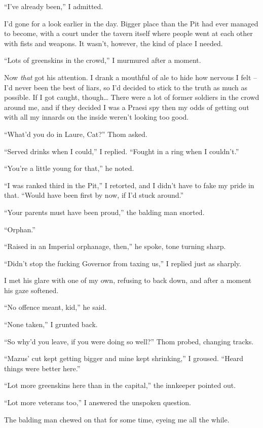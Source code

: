 \documentclass[12pt, openany]{book}
\begin{document}
“I’ve already been,” I admitted.

I’d gone for a look earlier in the day. Bigger place than the Pit had ever managed to become, with a court under the tavern itself where people went at each other with fists and weapons. It wasn’t, however, the kind of place I needed.

“Lots of greenskins in the crowd,” I murmured after a moment.

Now \textit{that} got his attention. I drank a mouthful of ale to hide how nervous I felt – I’d never been the best of liars, so I’d decided to stick to the truth as much as possible. If I got caught, though… There were a lot of former soldiers in the crowd around me, and if they decided I was a Praesi spy then my odds of getting out with all my innards on the inside weren’t looking too good.

“What’d you do in Laure, Cat?” Thom asked.

“Served drinks when I could,” I replied. “Fought in a ring when I couldn’t.”

“You’re a little young for that,” he noted.

“I was ranked third in the Pit,” I retorted, and I didn’t have to fake my pride in that. “Would have been first by now, if I’d stuck around.”

“Your parents must have been proud,” the balding man snorted.

“Orphan.”

“Raised in an Imperial orphanage, then,” he spoke, tone turning sharp.

“Didn’t stop the fucking Governor from taxing us,” I replied just as sharply.

I met his glare with one of my own, refusing to back down, and after a moment his gaze softened.

“No offence meant, kid,” he said.

“None taken,” I grunted back.

“So why’d you leave, if you were doing so well?” Thom probed, changing tracks.

“Mazus’ cut kept getting bigger and mine kept shrinking,” I groused. “Heard things were better here.”

“Lot more greenskins here than in the capital,” the innkeeper pointed out.

“Lot more veterans too,” I answered the unspoken question.

The balding man chewed on that for some time, eyeing me all the while.
\end{document}
